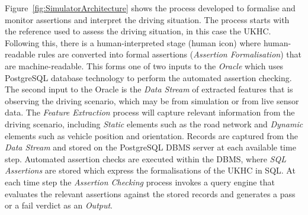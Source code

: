 Figure~\ref{fig:SimulatorArchitecture} shows the process developed to formalise and monitor assertions and interpret the driving situation. The process starts with the reference used to assess the driving situation, in this case the UKHC. Following this, there is a human-interpreted stage (human icon) where human-readable rules are converted into formal assertions (\emph{Assertion Formalisation}) that are machine-readable. This forms one of two inputs to the \emph{Oracle} which uses PostgreSQL database technology to perform the automated assertion checking. The second input to the Oracle is the \emph{Data Stream} of extracted features that is observing the driving scenario, which may be from simulation or from live sensor data. The \emph{Feature Extraction} process will capture relevant information from the driving scenario, including \emph{Static} elements such as the road network and \emph{Dynamic} elements such as vehicle position and orientation. Records are captured from the \emph{Data Stream} and stored on the PostgreSQL DBMS server at each available time step.
%
Automated assertion checks are executed within the DBMS, where \emph{SQL Assertions} are stored which express the formalisations of the UKHC in SQL. At each time step the \emph{Assertion Checking} process invokes a query engine that evaluates the relevant assertions against the stored records and generates a pass or a fail verdict as an \emph{Output}.



